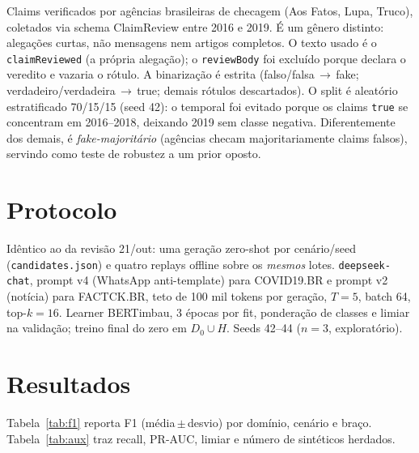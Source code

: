 \documentclass[conference]{IEEEtran}
\begin{document}
Claims verificados por ag\^encias brasileiras de checagem (Aos Fatos, Lupa, Truco), coletados via schema ClaimReview entre 2016 e 2019. \'E um g\^enero distinto: alega\c{c}\~oes curtas, n\~ao mensagens nem artigos completos. O texto usado \'e o \texttt{claimReviewed} (a pr\'opria alega\c{c}\~ao); o \texttt{reviewBody} foi exclu\'ido porque declara o veredito e vazaria o r\'otulo. A binariza\c{c}\~ao \'e estrita (falso/falsa\,$\to$\,fake; verdadeiro/verdadeira\,$\to$\,true; demais r\'otulos descartados). O split \'e aleat\'orio estratificado 70/15/15 (seed 42): o temporal foi evitado porque os claims \texttt{true} se concentram em 2016--2018, deixando 2019 sem classe negativa. Diferentemente dos demais, \'e \emph{fake-majorit\'ario} (ag\^encias checam majoritariamente claims falsos), servindo como teste de robustez a um prior oposto.

\section{Protocolo}

Id\^entico ao da revis\~ao 21/out: uma gera\c{c}\~ao zero-shot por cen\'ario/seed (\texttt{candidates.json}) e quatro replays offline sobre os \emph{mesmos} lotes. \texttt{deepseek-chat}, prompt v4 (WhatsApp anti-template) para COVID19.BR e prompt v2 (not\'icia) para FACTCK.BR, teto de 100 mil tokens por gera\c{c}\~ao, $T{=}5$, batch 64, top-$k{=}16$. Learner BERTimbau, 3 \'epocas por fit, pondera\c{c}\~ao de classes e limiar na valida\c{c}\~ao; treino final do zero em $D_0\cup H$. Seeds 42--44 ($n{=}3$, explorat\'orio).

\section{Resultados}

Tabela~\ref{tab:f1} reporta F1 (m\'edia\,$\pm$\,desvio) por dom\'inio, cen\'ario e bra\c{c}o. Tabela~\ref{tab:aux} traz recall, PR-AUC, limiar e n\'umero de sint\'eticos herdados.
\end{document}
